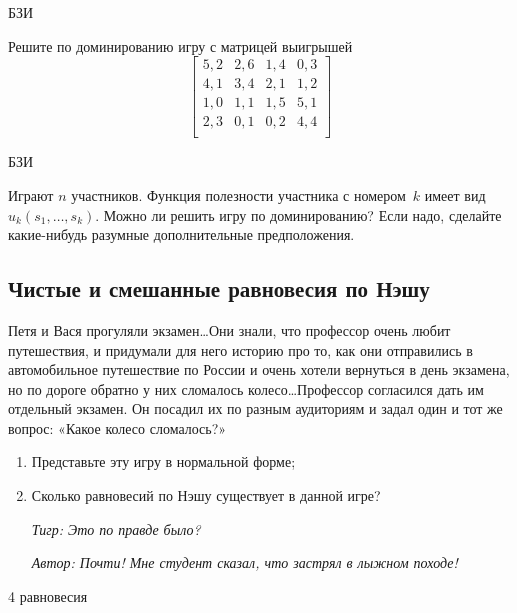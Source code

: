 \begin{problem}
\begin{source}
БЗИ
\end{source}
Решите по доминированию игру с матрицей
выигрышей
\[\left[\begin{array}{cccc} 5,2&2,6&1,4&0,3\\ 4,1&3,4&2,1&1,2\\
1,0&1,1&1,5&5,1\\ 2,3&0,1&0,2&4,4\\
\end{array}\right]\]
\begin{sol}
\end{sol}
\end{problem}




\begin{problem}
\begin{source}
БЗИ
\end{source}
Играют $n$ участников.
Функция полезности участника с номером~$k$ имеет вид
$u_k(s_1,\ldots,s_k)$. Можно ли решить игру по
доминированию? Если надо, сделайте какие-нибудь разумные дополнительные
предположения. {}
\begin{sol}
\end{sol}
\end{problem}




\subsection{Чистые и смешанные равновесия по Нэшу}





\begin{problem}\par
Петя и Вася прогуляли экзамен\ldots Они знали, что профессор очень любит путешествия, и придумали для него историю про то, как они отправились в автомобильное путешествие по России и очень хотели вернуться в день экзамена, но по дороге обратно у них сломалось колесо\ldots Профессор согласился дать им отдельный экзамен. Он посадил их по разным аудиториям и задал один и тот же вопрос: «Какое колесо сломалось?»\par
\begin{enumerate}
\item 	Представьте эту игру в нормальной форме;\par
\item 	Сколько равновесий по Нэшу существует в данной игре?\par
{\it Тигр: Это по правде было?}\par
{\red \it Автор: Почти! Мне студент сказал, что застрял в лыжном походе!}\par

\end{enumerate}


\begin{sol}
4 равновесия
\end{sol}
\end{problem}



